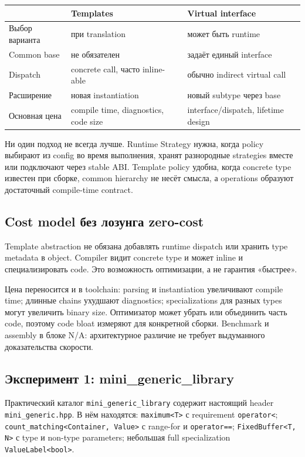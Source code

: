 \begin{center}
\begin{tabular}{p{}p{}p{}}
\toprule
 & Templates & Virtual interface \\
\midrule
Выбор варианта & при translation & может быть runtime \\
Common base & не обязателен & задаёт единый interface \\
Dispatch & concrete call, часто inline-able & обычно indirect virtual call \\
Расширение & новая instantiation & новый subtype через base \\
Основная цена & compile time, diagnostics, code size & interface/dispatch, lifetime design \\
\bottomrule
\end{tabular}
\end{center}

Ни один подход не всегда лучше. Runtime Strategy нужна, когда policy выбирают
из config во время выполнения, хранят разнородные strategies вместе или
подключают через stable ABI. Template policy удобна, когда concrete type
известен при сборке, common hierarchy не несёт смысла, а operations образуют
достаточный compile-time contract.

\subsection{Cost model без лозунга zero-cost}

Template abstraction не обязана добавлять runtime dispatch или хранить type
metadata в object. Compiler видит concrete type и может inline и
специализировать code. Это возможность оптимизации, а не гарантия «быстрее».

Цена переносится и в toolchain: parsing и instantiation увеличивают compile
time; длинные chains ухудшают diagnostics; specializations для разных types
могут увеличить binary size. Оптимизатор может убрать или объединить часть
code, поэтому code bloat измеряют для конкретной сборки. Benchmark и assembly
в блоке N/A: архитектурное различие не требует выдуманного доказательства
скорости.

\subsection{Эксперимент 1: mini\_generic\_library}

Практический каталог \texttt{mini\_generic\_library} содержит настоящий
header \texttt{mini\_generic.hpp}. В нём находятся:
\texttt{maximum<T>} с requirement \texttt{operator<}; \texttt{count\_matching<Container, Value>} с range-for и \texttt{operator==}; \texttt{FixedBuffer<T, N>} с type и non-type parameters; небольшая full specialization \texttt{ValueLabel<bool>}.

